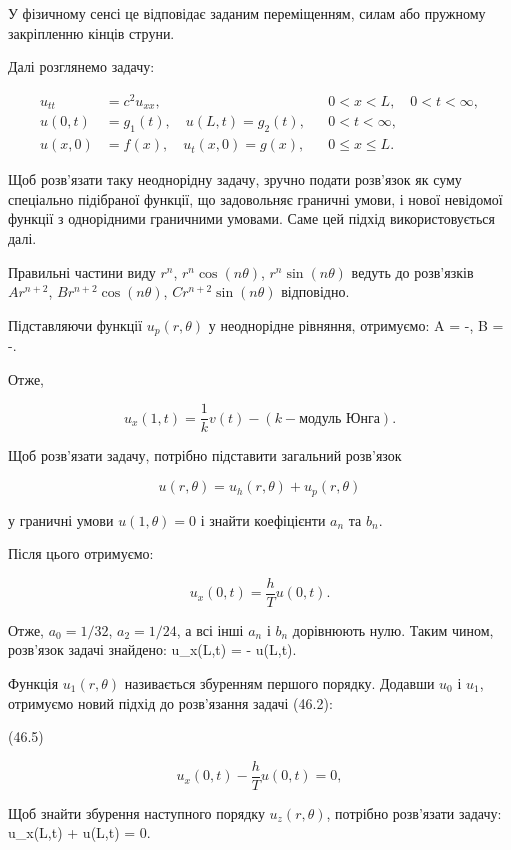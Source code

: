 \documentclass[
  ukrainian,
]{article}
\begin{document}
У фізичному сенсі це відповідає заданим переміщенням, силам або пружному
закріпленню кінців струни.

Далі розглянемо задачу:

\[
\begin{aligned}
u_{tt} &= c^2u_{xx}, && 0 < x < L,\quad 0 < t < \infty, \\
u(0,t) &= g_1(t), \quad u(L,t) = g_2(t), && 0 < t < \infty, \\
u(x,0) &= f(x), \quad u_t(x,0) = g(x), && 0 \leqslant x \leqslant L.
\end{aligned}
\]

Щоб розв'язати таку неоднорідну задачу, зручно подати розв'язок як суму
спеціально підібраної функції, що задовольняє граничні умови, і нової
невідомої функції з однорідними граничними умовами. Саме цей підхід
використовується далі.

Правильні частини виду \(r^n\), \(r^n \cos(n\theta)\),
\(r^n \sin(n\theta)\) ведуть до розв'язків\\
\(Ar^{n+2}\), \(Br^{n+2} \cos(n\theta)\), \(Cr^{n+2} \sin(n\theta)\)
відповідно.

Підставляючи функції \(u_p(r,\theta)\) у неоднорідне рівняння,
отримуємо: A = -, \qquad B = -.

Отже,

\[
u_x(1,t) = \frac{1}{k} v(t) - (k - \text{модуль Юнга}).
\]

Щоб розв'язати задачу, потрібно підставити загальний розв'язок

\[
u(r,\theta)=u_h(r,\theta)+u_p(r,\theta)
\]

у граничні умови \(u(1,\theta)=0\) і знайти коефіцієнти \(a_n\) та
\(b_n\).

Після цього отримуємо:

\[
u_x(0,t) = \frac{h}{T} u(0,t).
\]

Отже, \(a_0=1/32\), \(a_2=1/24\), а всі інші \(a_n\) і \(b_n\)
дорівнюють нулю. Таким чином, розв'язок задачі знайдено: u\_x(L,t) =
- u(L,t).

Функція \(u_1(r,\theta)\) називається збуренням першого порядку. Додавши
\(u_0\) і \(u_1\), отримуємо новий підхід до розв'язання задачі (46.2):

(46.5)

\[
u_x(0,t) - \frac{h}{T}u(0,t) = 0,
\]

Щоб знайти збурення наступного порядку \(u_z(r,\theta)\), потрібно
розв'язати задачу: u\_x(L,t) + u(L,t) = 0.
\end{document}
